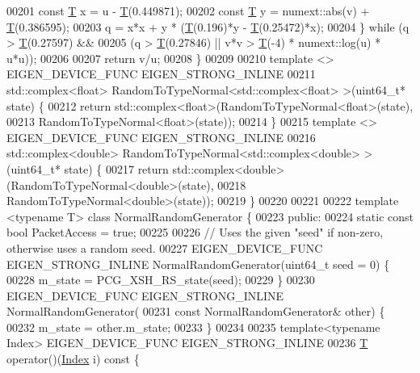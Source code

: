 \begin{DoxyCode}
00201     \textcolor{keyword}{const} \hyperlink{group___sparse_core___module_class_eigen_1_1_triplet}{T} x = u - \hyperlink{group___sparse_core___module_class_eigen_1_1_triplet}{T}(0.449871);
00202     \textcolor{keyword}{const} \hyperlink{group___sparse_core___module_class_eigen_1_1_triplet}{T} y = numext::abs(v) + \hyperlink{group___sparse_core___module_class_eigen_1_1_triplet}{T}(0.386595);
00203     q = x*x + y * (\hyperlink{group___sparse_core___module_class_eigen_1_1_triplet}{T}(0.196)*y - \hyperlink{group___sparse_core___module_class_eigen_1_1_triplet}{T}(0.25472)*x);
00204   \} \textcolor{keywordflow}{while} (q > \hyperlink{group___sparse_core___module_class_eigen_1_1_triplet}{T}(0.27597) &&
00205            (q > \hyperlink{group___sparse_core___module_class_eigen_1_1_triplet}{T}(0.27846) || v*v > \hyperlink{group___sparse_core___module_class_eigen_1_1_triplet}{T}(-4) * numext::log(u) * u*u));
00206 
00207   \textcolor{keywordflow}{return} v/u;
00208 \}
00209 
00210 \textcolor{keyword}{template} <> EIGEN\_DEVICE\_FUNC EIGEN\_STRONG\_INLINE
00211 std::complex<float> RandomToTypeNormal<std::complex<float> >(uint64\_t* state) \{
00212   \textcolor{keywordflow}{return} std::complex<float>(RandomToTypeNormal<float>(state),
00213                              RandomToTypeNormal<float>(state));
00214 \}
00215 \textcolor{keyword}{template} <> EIGEN\_DEVICE\_FUNC EIGEN\_STRONG\_INLINE
00216 std::complex<double> RandomToTypeNormal<std::complex<double> >(uint64\_t* state) \{
00217   \textcolor{keywordflow}{return} std::complex<double>(RandomToTypeNormal<double>(state),
00218                               RandomToTypeNormal<double>(state));
00219 \}
00220 
00221 
00222 \textcolor{keyword}{template} <\textcolor{keyword}{typename} T> \textcolor{keyword}{class }NormalRandomGenerator \{
00223  \textcolor{keyword}{public}:
00224   \textcolor{keyword}{static} \textcolor{keyword}{const} \textcolor{keywordtype}{bool} PacketAccess = \textcolor{keyword}{true};
00225 
00226   \textcolor{comment}{// Uses the given "seed" if non-zero, otherwise uses a random seed.}
00227   EIGEN\_DEVICE\_FUNC EIGEN\_STRONG\_INLINE NormalRandomGenerator(uint64\_t seed = 0) \{
00228     m\_state = PCG\_XSH\_RS\_state(seed);
00229   \}
00230   EIGEN\_DEVICE\_FUNC EIGEN\_STRONG\_INLINE NormalRandomGenerator(
00231       \textcolor{keyword}{const} NormalRandomGenerator& other) \{
00232     m\_state = other.m\_state;
00233   \}
00234 
00235  \textcolor{keyword}{template}<\textcolor{keyword}{typename} Index> EIGEN\_DEVICE\_FUNC EIGEN\_STRONG\_INLINE
00236   \hyperlink{group___sparse_core___module_class_eigen_1_1_triplet}{T} operator()(\hyperlink{namespace_eigen_a62e77e0933482dafde8fe197d9a2cfde}{Index} i)\textcolor{keyword}{ const }\{

\end{DoxyCode}
